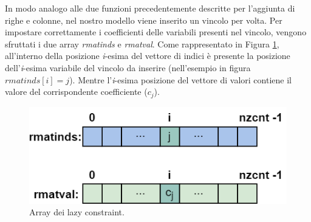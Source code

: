 In modo analogo alle due funzioni precedentemente descritte per l'aggiunta di righe e colonne, nel nostro modello viene inserito un vincolo per volta. Per impostare correttamente i coefficienti delle variabili presenti nel vincolo, vengono sfruttati i due array \textit{rmatinds} e \textit{rmatval}. Come rappresentato in Figura \ref{lazy_constraints}, all'interno della posizione \textit{i}-esima del vettore di indici è presente la posizione dell'\textit{i}-esima variabile del vincolo da inserire (nell'esempio in figura $rmatinds[i]=j$). Mentre l'\textit{i}-esima posizione del vettore di valori contiene il valore del corrispondente coefficiente ($c_j$).
\begin{figure}[h] 
\begin{center} 
  \includegraphics[scale=0.5]{Images/lazy_constraints} 
  \caption{\footnotesize{Array dei lazy constraint.}}
  \label{lazy_constraints} 
\end{center} 
\end{figure}
